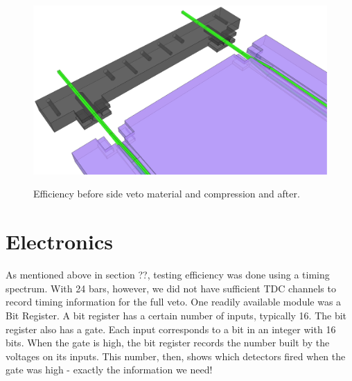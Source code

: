 \begin{figure}[ht]
\centering
\includegraphics[width=1.0\textwidth]{figures/veto_assembly.eps}
\label{fig:compareEfficiency}
\caption{Efficiency before side veto material and compression and after.}
\end{figure}

\section{Electronics}

As mentioned above in section ??, testing efficiency was done using a timing spectrum.  With 24 bars, however, we did not have sufficient TDC channels to record timing information for the full veto.  One readily available module was a Bit Register.  A bit register has a certain number of inputs, typically 16.  The bit register also has a gate.  Each input corresponds to a bit in an integer with 16 bits.  When the gate is high, the bit register records the number built by the voltages on its inputs.  This number, then, shows which detectors fired when the gate was high - exactly the information we need!

